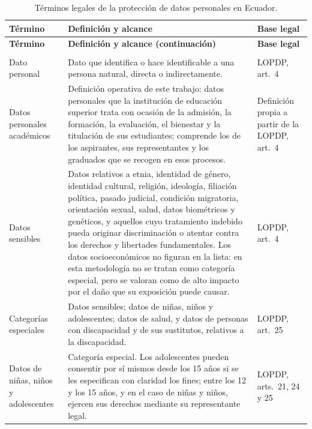 {\footnotesize
\renewcommand{\arraystretch}{1.2}
\begin{xltabular}{\textwidth}{|>{\raggedright\arraybackslash}p{3.2cm}|L|>{\raggedright\arraybackslash}p{2.6cm}|}
  \caption{Términos legales de la protección de datos personales en Ecuador.}
  \label{tab:terminos_legales} \\
  \hline
  \textbf{Término} & \textbf{Definición y alcance} & \textbf{Base legal} \\
  \hline
  \endfirsthead
  \hline
  \textbf{Término} & \textbf{Definición y alcance (continuación)} & \textbf{Base legal} \\
  \hline
  \endhead
  \hline
   \\
  \endfoot
  \hline
  \endlastfoot
  Dato personal & Dato que identifica o hace identificable a una persona natural, directa o indirectamente. & LOPDP, art.~4 \\
  \hline
  Datos personales académicos & Definición operativa de este trabajo: datos personales que la institución de educación superior trata con ocasión de la admisión, la formación, la evaluación, el bienestar y la titulación de sus estudiantes; comprende los de los aspirantes, sus representantes y los graduados que se recogen en esos procesos. & Definición propia a partir de la LOPDP, art.~4 \\
  \hline
  Datos sensibles & Datos relativos a etnia, identidad de género, identidad cultural, religión, ideología, filiación política, pasado judicial, condición migratoria, orientación sexual, salud, datos biométricos y genéticos, y aquellos cuyo tratamiento indebido pueda originar discriminación o atentar contra los derechos y libertades fundamentales. Los datos socioeconómicos no figuran en la lista: en esta metodología no se tratan como categoría especial, pero se valoran como de alto impacto por el daño que su exposición puede causar. & LOPDP, art.~4 \\
  \hline
  Categorías especiales & Datos sensibles; datos de niñas, niños y adolescentes; datos de salud, y datos de personas con discapacidad y de sus sustitutos, relativos a la discapacidad. & LOPDP, art.~25 \\
  \hline
  Datos de niñas, niños y adolescentes & Categoría especial. Los adolescentes pueden consentir por sí mismos desde los 15 años si se les especifican con claridad los fines; entre los 12 y los 15 años, y en el caso de niñas y niños, ejercen sus derechos mediante su representante legal. & LOPDP, arts.~21, 24 y 25 \\

\end{xltabular}}
